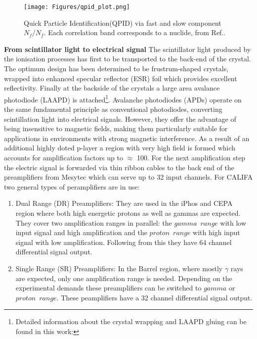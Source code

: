\begin{figure}[htpb]
    \centering
    \texttt{[image: Figures/qpid\_plot.png]}
    \caption{
    Quick Particle Identification(QPID) via fast and slow component $N_{f} / N_{f}$. Each correlation band corresponds to a nuclide, from Ref.\cite{winkel2016komplexe}.
    }
    \label{fig:qpid_califa}
\end{figure}

\textbf{From scintillator light to electrical signal}\newline
The scintillator light produced by the ionisation processes  has first to be transported to the back-end of the crystal. The optimum design has been determined to be frustrum-shaped crystals, wrapped into enhanced specular reflector (ESR) foil which provides excellent reflectivity. Finally at the backside of the crystals a large area avalance photodiode (LAAPD) is attached\footnote{Detailed information about the crystal wrapping and LAAPD gluing can be found in this work:\cite{hartigevolution}}. Avalanche photodiodes (APDs) operate on the same fundamental principle as conventional photodiodes, converting scintillation light into electrical signals. However, they offer the advantage of being insensitive to magnetic fields, making them particularly suitable for applications in environments with strong magnetic interference. As a result of an additional highly doted p-layer a region with very high field is formed which accounts for amplification factors up to $\approx$ 100.\newline
For the next amplification step the  electric signal is forwarded via thin ribbon cables to the back end of the preamplifiers from Mesytec\cite{mesytec-home} which can serve up to 32 input channels. For CALIFA two general types of peramplifiers are in use:
\begin{enumerate}
\item Dual Range (DR) Preamplifiers: They are used in the iPhos and CEPA region where both high energetic protons as well as gammas are expected. They cover two amplification ranges in parallel: the $gamma \enspace range$ with low input signal and high amplification and the $proton \enspace range$ with high input signal with low amplification. Following from this they have 64 channel differential signal output.
\item Single Range (SR) Preamplifiers: In the Barrel region, where mostly $\gamma$ rays are expected, only one amplification range is needed. Depending on the experimental demands these preamplifiers can be switched to $gamma$ or $proton \enspace range$. These peamplifiers have a 32 channel differential signal output.
\end{enumerate}
